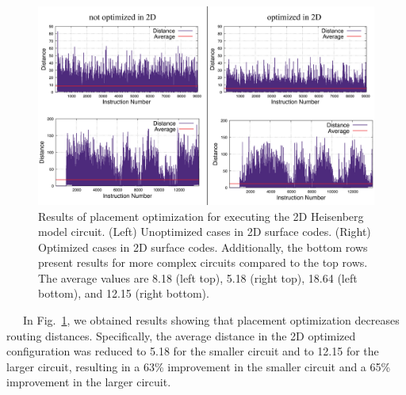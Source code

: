 \documentclass[a4paper,11pt]{ltjsarticle}
\begin{document}
{    \begin{figure}[h]
        \centering
        \includegraphics[scale=0.5]{figure/placement_optimization_2D.eps}
        \vspace{-20pt}\caption{Results of placement optimization for executing the 2D Heisenberg model circuit. (Left) Unoptimized cases in 2D surface codes. (Right) Optimized cases in 2D surface codes. Additionally, the bottom rows present results for more complex circuits compared to the top rows. The average values are 8.18 (left top), 5.18 (right top), 18.64 (left bottom), and 12.15 (right bottom).}
        \label{placement_optimization_2D}
    \end{figure}

    \vspace{-5pt}
    \ \ \ In Fig.~\ref{placement_optimization_2D}, we obtained results showing that placement optimization decreases routing distances. Specifically, the average distance in the 2D optimized configuration was reduced to 5.18 for the smaller circuit and to 12.15 for the larger circuit, resulting in a 63\% improvement in the smaller circuit and a 65\% improvement in the larger circuit.
    
}
\end{document}
